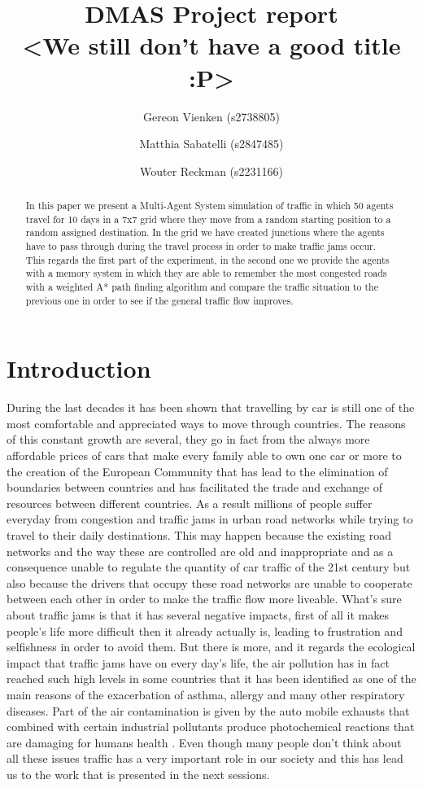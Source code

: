 \documentclass[a4paper,hidelinks]{article}
\title{\textbf{\huge DMAS Project report\\ <We still don't have a good title :P>}%
}
\author{Gereon Vienken (s2738805) \and
    Matthia Sabatelli (s2847485) \and
    Wouter Reckman (s2231166)
}
\date{}
\begin{document}
\ttl
\thispagestyle{empty}

%


\begin{abstract}
\noindent
In this paper we present a Multi-Agent System simulation of traffic in which 50 agents travel for 10 days in a 7x7 grid where they move from a random starting position to a random assigned destination. In the grid we have created junctions where the agents have to pass through during the travel process in order to make traffic jams occur. This regards the first part of the experiment, in the second one we provide the agents with a memory system in which they are able to remember the most congested roads with a weighted A* path finding algorithm and compare the traffic situation to the previous one in order to see if the general traffic flow improves. 
\end{abstract}


\section{Introduction}
During the last decades it has been shown that travelling by car is still one of the most comfortable and appreciated ways to move through countries. The reasons of this constant growth are several, they go in fact from the always more affordable prices of cars that make every family able to own one car or more to the creation of the European Community that has lead to the elimination of boundaries between countries and has facilitated the trade and exchange of resources between different countries. As a result millions of people suffer everyday from congestion and traffic jams in urban road networks while trying to travel to their daily destinations. This may happen because the existing road networks and the way these are controlled are old and inappropriate and as a consequence unable to regulate the quantity of car traffic of the 21st century but also because the drivers that occupy these road networks are unable to cooperate between each other in order to make the traffic flow more liveable. What's sure about traffic jams is that it has several negative impacts, first of all it makes people's life more difficult then it already actually is, leading to frustration and selfishness in order to avoid them. But there is more, and it regards the ecological impact that traffic jams have on every day's life, the air pollution has in fact reached such high levels in some countries that it has been identified as one of the main reasons of the exacerbation of asthma, allergy and many other respiratory diseases. Part of the air contamination is given by the auto mobile exhausts that combined with certain industrial pollutants produce photochemical reactions that are damaging for humans health \cite{ghose2005assessment}. Even though many people don't think about all these issues traffic has a very important role in our society and this has lead us to the work that is presented in the next sessions.             
\end{document}

